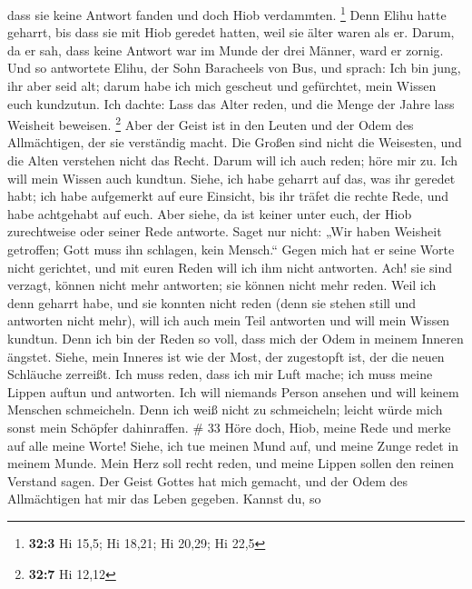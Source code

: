 dass sie keine Antwort fanden und doch Hiob verdammten. \footnote{\textbf{32:3}
  Hi 15,5; Hi 18,21; Hi 20,29; Hi 22,5}  Denn Elihu hatte
geharrt, bis dass sie mit Hiob geredet hatten, weil sie älter waren als
er.  Darum, da er sah, dass keine Antwort war im Munde der
drei Männer, ward er zornig.  Und so antwortete Elihu, der
Sohn Baracheels von Bus, und sprach: Ich bin jung, ihr aber seid alt;
darum habe ich mich gescheut und gefürchtet, mein Wissen euch kundzutun.
 Ich dachte: Lass das Alter reden, und die Menge der Jahre
lass Weisheit beweisen. \footnote{\textbf{32:7} Hi 12,12} 
Aber der Geist ist in den Leuten und der Odem des Allmächtigen, der sie
verständig macht.  Die Großen sind nicht die Weisesten,
und die Alten verstehen nicht das Recht.  Darum will ich
auch reden; höre mir zu. Ich will mein Wissen auch kundtun.
 Siehe, ich habe geharrt auf das, was ihr geredet habt;
ich habe aufgemerkt auf eure Einsicht, bis ihr träfet die rechte Rede,
 und habe achtgehabt auf euch. Aber siehe, da ist keiner
unter euch, der Hiob zurechtweise oder seiner Rede antworte.
 Saget nur nicht: „Wir haben Weisheit getroffen; Gott
muss ihn schlagen, kein Mensch.``  Gegen mich hat er
seine Worte nicht gerichtet, und mit euren Reden will ich ihm nicht
antworten.  Ach! sie sind verzagt, können nicht mehr
antworten; sie können nicht mehr reden.  Weil ich denn
geharrt habe, und sie konnten nicht reden (denn sie stehen still und
antworten nicht mehr),  will ich auch mein Teil antworten
und will mein Wissen kundtun.  Denn ich bin der Reden so
voll, dass mich der Odem in meinem Inneren ängstet. 
Siehe, mein Inneres ist wie der Most, der zugestopft ist, der die neuen
Schläuche zerreißt.  Ich muss reden, dass ich mir Luft
mache; ich muss meine Lippen auftun und antworten.  Ich
will niemands Person ansehen und will keinem Menschen schmeicheln.
 Denn ich weiß nicht zu schmeicheln; leicht würde mich
sonst mein Schöpfer dahinraffen. \# 33  Höre doch, Hiob,
meine Rede und merke auf alle meine Worte!  Siehe, ich tue
meinen Mund auf, und meine Zunge redet in meinem Munde. 
Mein Herz soll recht reden, und meine Lippen sollen den reinen Verstand
sagen.  Der Geist Gottes hat mich gemacht, und der Odem
des Allmächtigen hat mir das Leben gegeben.  Kannst du, so
